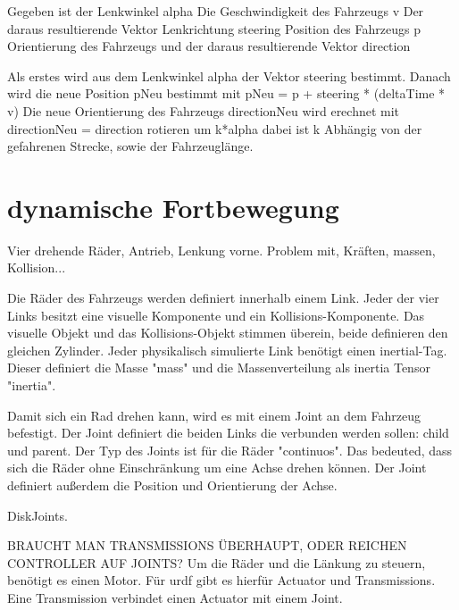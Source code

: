 Gegeben ist der Lenkwinkel alpha
Die Geschwindigkeit des Fahrzeugs v
Der daraus resultierende Vektor Lenkrichtung steering
Position des Fahrzeugs p
Orientierung des Fahrzeugs und der daraus resultierende Vektor direction

Als erstes wird aus dem Lenkwinkel alpha der Vektor steering bestimmt.
Danach wird die neue Position pNeu bestimmt mit pNeu = p + steering * (deltaTime * v)
Die neue Orientierung des Fahrzeugs directionNeu wird erechnet mit directionNeu = direction rotieren um k*alpha
dabei ist k Abhängig von der gefahrenen Strecke, sowie der Fahrzeuglänge.

\section{dynamische Fortbewegung}
Vier drehende Räder, Antrieb, Lenkung vorne.
Problem mit, Kräften, massen, Kollision...

Die Räder des Fahrzeugs werden definiert innerhalb einem Link.
Jeder der vier Links besitzt eine visuelle Komponente und ein Kollisions-Komponente.
Das visuelle Objekt und das Kollisions-Objekt stimmen überein, beide definieren den gleichen Zylinder.
Jeder physikalisch simulierte Link benötigt einen inertial-Tag.
Dieser definiert die Masse "mass" und die Massenverteilung als inertia Tensor "inertia".

Damit sich ein Rad drehen kann, wird es mit einem Joint an dem Fahrzeug befestigt.
Der Joint definiert die beiden Links die verbunden werden sollen: child und parent.
Der Typ des Joints ist für die Räder "continuos". Das bedeuted, dass sich die Räder ohne Einschränkung um eine Achse drehen können.
Der Joint definiert außerdem die Position und Orientierung der Achse.

DiskJoints.

BRAUCHT MAN TRANSMISSIONS ÜBERHAUPT, ODER REICHEN CONTROLLER AUF JOINTS?
Um die Räder und die Länkung zu steuern, benötigt es einen Motor. 
Für urdf gibt es hierfür Actuator und Transmissions.
Eine Transmission verbindet einen Actuator mit einem Joint. 